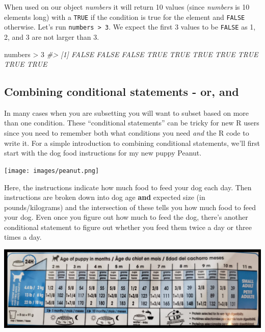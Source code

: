 \documentclass[
  12pt,
]{book}
\newenvironment{Shaded}{\begin{snugshade}}{\end{snugshade}}
\newcommand{\CommentTok}[1]{\textcolor[rgb]{0.37,0.37,0.37}{\textit{#1}}}
\newcommand{\DecValTok}[1]{\textcolor[rgb]{0.06,0.06,0.06}{#1}}
\newcommand{\NormalTok}[1]{#1}
\newcommand{\SpecialCharTok}[1]{\textcolor[rgb]{0,0,0}{#1}}
\begin{document}
When used on our object \emph{numbers} it will return 10 values (since \emph{numbers} is 10 elements long) with a \texttt{TRUE} if the condition is true for the element and \texttt{FALSE} otherwise. Let's run \texttt{numbers\ \textgreater{}\ 3}. We expect the first 3 values to be \texttt{FALSE} as 1, 2, and 3 are not larger than 3.

\begin{Shaded}
\begin{Highlighting}[]
\NormalTok{numbers }\SpecialCharTok{\textgreater{}} \DecValTok{3}
\CommentTok{\#\textgreater{}  [1] FALSE FALSE FALSE  TRUE  TRUE  TRUE  TRUE  TRUE  TRUE  TRUE}
\end{Highlighting}
\end{Shaded}

\hypertarget{combining-conditional-statements---or-and}{%
\subsection{Combining conditional statements - or, and}\label{combining-conditional-statements---or-and}}

In many cases when you are subsetting you will want to subset based on more than one condition. These ``conditional statements'' can be tricky for new R users since you need to remember both what conditions you need \emph{and} the R code to write it. For a simple introduction to combining conditional statements, we'll first start with the dog food instructions for my new puppy Peanut.

\texttt{[image: images/peanut.png]}

Here, the instructions indicate how much food to feed your dog each day. Then instructions are broken down into dog age \textbf{and} expected size (in pounds/kilograms) and the intersection of these tells you how much food to feed your dog. Even once you figure out how much to feed the dog, there's another conditional statement to figure out whether you feed them twice a day or three times a day.

\includegraphics{images/dog_food.PNG}
\end{document}

